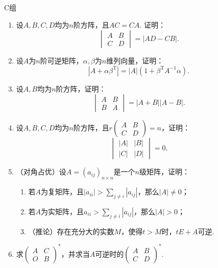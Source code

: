 \centerline{\heiti C组}
\begin{enumerate}
    \item 设$A,B,C,D$均为$n$阶方阵，且$AC=CA$. 证明：
          \[\begin{vmatrix}
                  A & B \\ C & D
              \end{vmatrix} = |AD-CB|.\]

    \item 设$A$为$n$阶可逆矩阵，$\alpha,\beta$为$n$维列向量，证明：
          \[|A+\alpha\beta^{\mathrm{T}}|=|A|(1+\beta^\mathrm{T}A^{-1}\alpha).\]

    \item 设$A,B$均为$n$阶方阵，证明：
          \[\begin{vmatrix}
                  A & B \\ B & A
              \end{vmatrix} = |A+B||A-B|.\]

    \item 设$A,B,C,D$均为$n$阶方阵，且$r\begin{pmatrix}
                  A & B \\ C & D
              \end{pmatrix}=n$，证明：
          \[\begin{vmatrix}
                  |A| & |B| \\ |C| & |D|
              \end{vmatrix} = 0.\]

    \item （对角占优）设$A=(a_{ij})_{n \times n}$是一个$n$级矩阵，证明：
          \begin{enumerate}
              \item 若$A$为复矩阵，且$|a_{ii}|>\displaystyle\sum_{j \neq i}|a_{ij}|$，那么$|A|\neq 0$；

              \item 若$A$为实矩阵，且$a_{ii}>\displaystyle\sum_{j \neq i}|a_{ij}|$，那么$|A|>0$；

              \item （推论）存在充分大的实数$M$，使得$t>M$时，$tE+A$可逆.
          \end{enumerate}

    \item 求$\begin{pmatrix}
                  A & C \\ O & B
              \end{pmatrix}^*$，并求当$A$可逆时的$\begin{pmatrix}
                  A & B \\ C & D
              \end{pmatrix}^*$.


\end{enumerate}
